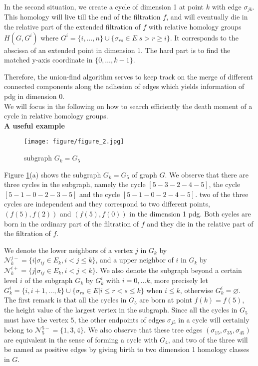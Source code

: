 \documentclass[a4paper,12pt]{article}
\numberwithin{equation}{section}
\begin{document}
	In the second situation, we create a cycle of dimension 1 at point $k$ with edge $\sigma_{jk}$. This homology will live till the end of the filtration $f$, and will eventually die in the relative part of the extended filtration of $f$ with relative homology groups $H(G, G^i)$ where $G^{i} = \{i,\ldots,n\} \cup \{ \sigma_{rs} \in E \vert s >r \geq i \}$. It corresponds to the abscissa of an extended point in dimension 1. The hard part is to find the matched y-axis coordinate in $\{0,\ldots,k-1\}$.
	
	Therefore, the union-find algorithm serves to keep track on the merge of different connected components along the adhesion of edges which yields information of pdg in dimension 0.\\
	
	We will focus in the following on how to search efficiently the death moment of a cycle in relative homology groups.\\
	
	\newpage
	\noindent
	\textbf{A useful example}
	
	\begin{figure}[!hbtp]
	  \centering				
	  \texttt{[image: figure/figure\_2.jpg]}
	  \caption{subgraph $G_k = G_5$}
	  \label{fig:graph_G_5}		
	\end{figure}
	
	Figure \ref{fig:graph_G_5}(a) shows the subgraph $G_k = G_5$ of graph $G$. We observe that there are three cycles in the subgraph, namely the cycle $[5-3-2-4-5]$, the cycle $[5-1-0-2-3-5]$ and the cycle $[5-1-0-2-4-5]$. two of the three cycles are independent and they correspond to two different points, $(f(5),f(2))$ and $(f(5),f(0))$ in the dimension 1 pdg. Both cycles are born in the ordinary part of the filtration of $f$ and they die in the relative part of the filtration of $f$. 
	
	We denote the lower neighbors of a vertex $j$ in $G_k$ by $\mathcal{N}^{j-}_k = \{i \vert \sigma_{ij} \in E_k ,i< j \leq k \}$, and a upper neighbor of $i$ in $G_k$ by $\mathcal{N}^{i+}_k = \{j \vert \sigma_{ij} \in E_k, i <j <k \}$. We also denote the subgraph beyond a certain level $i$ of the subgraph $G_k$ by $G_k^{i}$ with $i = 0,...k$, more precisely let $G_k^i = \{i,i+1,\dots,k\} \cup \{\sigma_{rs} \in E \vert i \leq r < s \leq k \}$ when $i \leq k$, otherwise $G_{k}^i = \varnothing$.\\
	
	The first remark is that all the cycles in $G_5$ are born at point $f(k) = f(5)$, the height value of the largest vertex in the subgraph. Since all the cycles in $G_5$ must have the vertex $5$, the other endpoints of edges $\sigma_{j5}$ in a cycle will certainly belong to $\mathcal{N}^{5-}_5 = \{1,3,4\}$. We also observe that these tree edges $(\sigma_{15}, \sigma_{35}, \sigma_{45})$ are equivalent in the sense of forming a cycle with $G_4$, and two of the three will be named as positive edges by giving birth to two dimension 1 homology classes in $G$.\\
\end{document}

